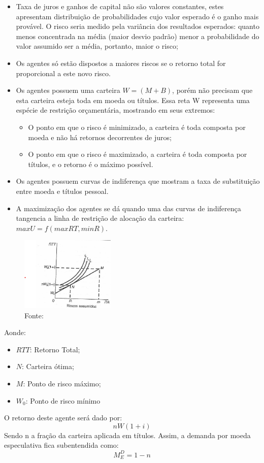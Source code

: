 \documentclass[12pt,a4paper,oneside,brazil]{abntex2}
\begin{document}
\begin{itemize}
\item Taxa de juros e ganhos de capital não são valores constantes, estes apresentam distribuição de probabilidades cujo valor esperado é o ganho mais provável. O risco seria medido pela variância dos resultados esperados: quanto menos concentrada na média (maior desvio padrão) menor a probabilidade do valor assumido ser a média, portanto, maior o risco;
\item Os agentes só estão dispostos a maiores riscos se o retorno total for proporcional a este novo risco.
\item Os agentes possuem uma carteira $W = ( M + B)$, porém não precisam que esta carteira esteja toda em moeda ou títulos. Essa reta W representa uma espécie de restrição orçamentária, mostrando em seus extremos:
\begin{itemize}
\item O ponto em que o risco é minimizado, a carteira é toda composta por moeda e não há retornos decorrentes de juros;
\item O ponto em que o risco é maximizado, a carteira é toda composta por títulos, e o retorno é o máximo possível.
\end{itemize}
\item Os agentes possuem curvas de indiferença que mostram a taxa de substituição entre moeda e títulos pessoal.
\item A maximização dos agentes se dá quando uma das curvas de indiferença tangencia a linha de restrição de alocação da carteira: $max U = f( max RT, min R)$.
\end{itemize}

\begin{figure}
	\includegraphics[width=0.4\textwidth]{Contribuicao de Tobin.png}
	\centering
	\caption{Fonte: \cite[p. 82]{rossetti98}}
	
\end{figure}
Aonde:
\begin{itemize}
\item $RTT$: Retorno Total;
\item $N$: Carteira ótima;
\item $M$: Ponto de risco máximo;
\item $W_0$: Ponto de risco mínimo
\end{itemize}
\clearpage
O retorno deste agente será dado por: 
\[ n W ( 1 + i) \]
Sendo n a fração da carteira aplicada em títulos. Assim, a demanda por moeda especulativa fica subentendida como:
\[ M^{D}_{E} = 1- n \]
\end{document}
